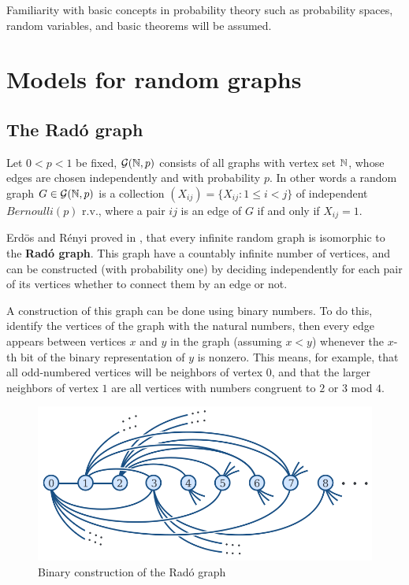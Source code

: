 Familiarity with basic concepts in probability theory such as probability spaces, random variables, and basic theorems will be assumed.

\section{Models for random graphs}

\subsection{The Radó graph}
Let $0 < p < 1$ be fixed, $\mathcal{G}(\mathbb{N}, p)$ consists of all graphs with vertex set $\mathbb{N}$, whose edges are chosen independently and with probability $p$. In other words a random graph $G \in \mathcal{G}(\mathbb{N},p)$ is a collection $(X_{ij}) = \{ X_{ij} : 1 \leq i < j\}$ of independent $Bernoulli(p)$ r.v., where a pair $ij$ is an edge of $G$ if and only if $X_{ij} = 1$.

Erdös and Rényi proved in \cite[Erdös, Rényi]{RadoUnique}, that every infinite random graph is isomorphic to the \textbf{Radó graph}. This graph have a countably infinite number of vertices, and can be constructed (with probability one) by deciding independently for each pair of its vertices whether to connect them by an edge or not.

A construction of this graph can be done using binary numbers. To do this, identify the vertices of the graph with the natural numbers, then every edge appears between vertices $x$ and $y$ in the graph (assuming $x < y$) whenever the $x$-th bit of the binary representation of $y$ is nonzero. This means, for example, that all odd-numbered vertices will be neighbors of vertex $0$, and that the larger neighbors of vertex $1$ are all vertices with numbers congruent to $2$ or $3$ mod $4$.

\begin{figure}[h!]
	\centering
	\includegraphics[scale=0.7]{Figures/Rado-graph.png}
	\caption{Binary construction of the Radó graph}
\end{figure}

